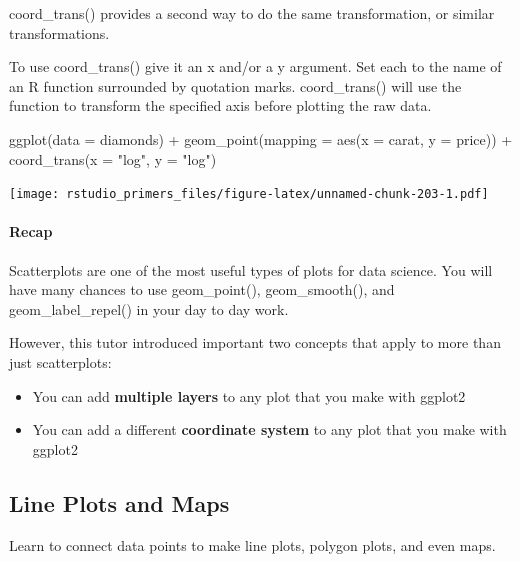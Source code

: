 \documentclass[
]{article}
\newenvironment{Shaded}{\begin{snugshade}}{\end{snugshade}}
\newcommand{\AttributeTok}[1]{\textcolor[rgb]{0.77,0.63,0.00}{#1}}
\newcommand{\FunctionTok}[1]{\textcolor[rgb]{0.00,0.00,0.00}{#1}}
\newcommand{\NormalTok}[1]{#1}
\newcommand{\SpecialCharTok}[1]{\textcolor[rgb]{0.00,0.00,0.00}{#1}}
\newcommand{\StringTok}[1]{\textcolor[rgb]{0.31,0.60,0.02}{#1}}
\providecommand{\tightlist}{%
  \setlength{\itemsep}{0pt}\setlength{\parskip}{0pt}}
\begin{document}
coord\_trans() provides a second way to do the same transformation, or
similar transformations.

To use coord\_trans() give it an x and/or a y argument. Set each to the
name of an R function surrounded by quotation marks. coord\_trans() will
use the function to transform the specified axis before plotting the raw
data.

\begin{Shaded}
\begin{Highlighting}[]
\FunctionTok{ggplot}\NormalTok{(}\AttributeTok{data =}\NormalTok{ diamonds) }\SpecialCharTok{+}
  \FunctionTok{geom\_point}\NormalTok{(}\AttributeTok{mapping =} \FunctionTok{aes}\NormalTok{(}\AttributeTok{x =}\NormalTok{ carat, }\AttributeTok{y =}\NormalTok{ price)) }\SpecialCharTok{+}
  \FunctionTok{coord\_trans}\NormalTok{(}\AttributeTok{x =} \StringTok{"log"}\NormalTok{, }\AttributeTok{y =} \StringTok{"log"}\NormalTok{)}
\end{Highlighting}
\end{Shaded}

\texttt{[image: rstudio\_primers\_files/figure-latex/unnamed-chunk-203-1.pdf]}

\hypertarget{recap-6}{%
\paragraph{Recap}\label{recap-6}}

Scatterplots are one of the most useful types of plots for data science.
You will have many chances to use geom\_point(), geom\_smooth(), and
geom\_label\_repel() in your day to day work.

However, this tutor introduced important two concepts that apply to more
than just scatterplots:

\begin{itemize}
\tightlist
\item
  You can add \textbf{multiple layers} to any plot that you make with
  ggplot2
\item
  You can add a different \textbf{coordinate system} to any plot that
  you make with ggplot2
\end{itemize}

\hypertarget{line-plots-and-maps}{%
\subsection{Line Plots and Maps}\label{line-plots-and-maps}}

Learn to connect data points to make line plots, polygon plots, and even
maps.
\end{document}

